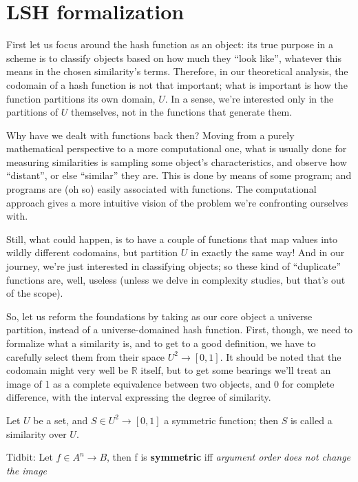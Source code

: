 \documentclass{report}
\newcommand{\real}{\mathbb{R}}
\begin{document}
	
\section{LSH formalization}

    First let us focus around the hash function as an object: its true purpose in a scheme is to classify objects based on how much they ``look like'', whatever this means in the chosen similarity's terms. Therefore, in our theoretical analysis, the codomain of a hash function is not that important; what is important is how the function partitions its own domain, $U$. In a sense, we're interested only in the partitions of $U$ themselves, not in the functions that generate them.
    
	Why have we dealt with functions back then? Moving from a purely mathematical perspective to a more computational one, what is usually done for measuring similarities is sampling some object's characteristics, and observe how ``distant'', or else ``similar'' they are. This is done by means of some program; and programs are (oh so) easily associated with functions. The computational approach gives a more intuitive vision of the problem we're confronting ourselves with.
    
    Still, what could happen, is to have a couple of functions that map values into wildly different codomains, but partition $U$ in exactly the same way! And in our journey, we're just interested in classifying objects; so these kind of ``duplicate'' functions are, well, useless (unless we delve in complexity studies, but that's out of the scope).
    
	So, let us reform the foundations by taking as our core object a universe partition, instead of a universe-domained hash function. First, though, we need to formalize what a similarity is, and to get to a good definition, we have to carefully select them from their space $U^2 \to [0, 1]$. It should be noted that the codomain might very well be $\real$ itself, but to get some bearings we'll treat an image of 1 as a complete equivalence between two objects, and 0 for complete difference, with the interval expressing the degree of similarity.
	
	
	
	Let $U$ be a set, and $S \in U^2 \to [0, 1]$ a symmetric function; then $S$ is called a similarity over $U$.
	
	Tidbit: Let $f \in A^n \to B$, then f is \textbf{symmetric} iff \textit{argument order does not change the image} %
	
\end{document}

